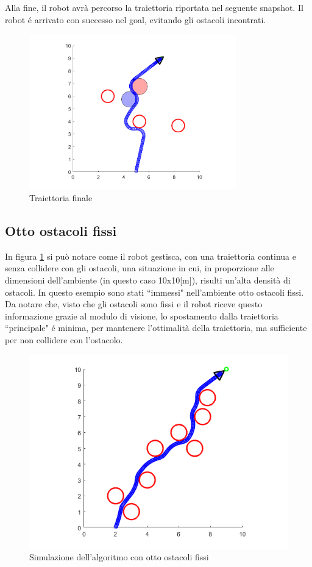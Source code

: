 \documentclass[14pt,a4paper]{extarticle}
\begin{document}
Alla fine, il robot avrà percorso la traiettoria riportata nel seguente snapshot. Il robot é arrivato con successo nel goal, evitando gli ostacoli incontrati.
\begin{figure}[H]
\centering
\includegraphics[width=0.8\textwidth]{treobst_finale.png}
\caption{Traiettoria finale}
\end{figure}

\subsection{Otto ostacoli fissi}
In figura \ref{moltiostacoli} si può notare come il robot gestisca, con una traiettoria continua e senza collidere con gli ostacoli, una situazione in cui, in proporzione alle dimensioni dell'ambiente (in questo caso 10x10[m]), risulti un'alta densità di ostacoli. In questo esempio sono stati ``immessi" nell'ambiente otto ostacoli fissi. Da notare che, visto che gli ostacoli sono fissi e il robot riceve questo informazione grazie al modulo di visione, lo spostamento dalla traiettoria ``principale" é minima, per mantenere l'ottimalità della traiettoria, ma sufficiente per non collidere con l'ostacolo.

\begin{figure}[H]
\includegraphics[width=\textwidth]{moltiostacoli.png}
\caption{Simulazione dell'algoritmo con otto ostacoli fissi}
\label{moltiostacoli}
\end{figure}
\end{document}
